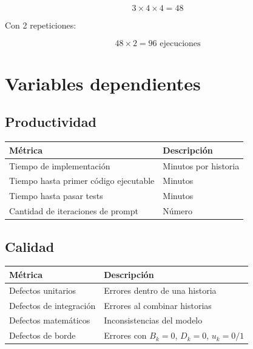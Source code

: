 \documentclass[11pt,a4paper]{article}
\begin{document}
\begin{equation}
3 \times 4 \times 4 = 48
\end{equation}

Con 2 repeticiones:

\begin{equation}
48 \times 2 = 96 \text{ ejecuciones}
\end{equation}

\section{Variables dependientes}

\subsection{Productividad}

\begin{table}[h!]
\centering
\begin{tabular}{ll}
\toprule
\textbf{M\'etrica} & \textbf{Descripci\'on} \\
\midrule
Tiempo de implementaci\'on & Minutos por historia \\
Tiempo hasta primer c\'odigo ejecutable & Minutos \\
Tiempo hasta pasar tests & Minutos \\
Cantidad de iteraciones de prompt & N\'umero \\
\bottomrule
\end{tabular}
\end{table}

\subsection{Calidad}

\begin{table}[h!]
\centering
\begin{tabular}{ll}
\toprule
\textbf{M\'etrica} & \textbf{Descripci\'on} \\
\midrule
Defectos unitarios & Errores dentro de una historia \\
Defectos de integraci\'on & Errores al combinar historias \\
Defectos matem\'aticos & Inconsistencias del modelo \\
Defectos de borde & Errores con $B_k=0$, $D_k=0$, $u_k=0/1$ \\
\bottomrule
\end{tabular}
\end{table}
\end{document}
